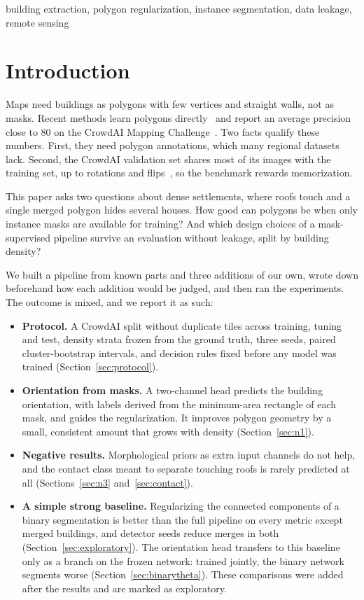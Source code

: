 \documentclass[conference]{IEEEtran}
\begin{document}
\begin{IEEEkeywords}
building extraction, polygon regularization, instance segmentation, data leakage, remote sensing
\end{IEEEkeywords}

\section{Introduction}
Maps need buildings as polygons with few vertices and straight walls, not as masks. Recent methods learn polygons
directly~\cite{girard2021ffl,zorzi2022polyworld,xu2023hisup,jiao2024polyrcnn,adimoolam2025pix2poly} and report an average
precision close to 80 on the CrowdAI Mapping Challenge~\cite{mohanty2020crowdai}. Two facts qualify these numbers. First,
they need polygon annotations, which many regional datasets lack. Second, the CrowdAI validation set shares most of its
images with the training set, up to rotations and flips~\cite{adimoolam2023leakage}, so the benchmark rewards
memorization.

This paper asks two questions about dense settlements, where roofs touch and a single merged polygon hides several
houses. How good can polygons be when only instance masks are available for training? And which design choices of a
mask-supervised pipeline survive an evaluation without leakage, split by building density?

We built a pipeline from known parts and three additions of our own, wrote down beforehand how each addition would be
judged, and then ran the experiments. The outcome is mixed, and we report it as such:
\begin{itemize}
\item \textbf{Protocol.} A CrowdAI split without duplicate tiles across training, tuning and test, density strata frozen
from the ground truth, three seeds, paired cluster-bootstrap intervals, and decision rules fixed before any model was
trained (Section~\ref{sec:protocol}).
\item \textbf{Orientation from masks.} A two-channel head predicts the building orientation, with labels derived from the
minimum-area rectangle of each mask, and guides the regularization. It improves polygon geometry by a small, consistent
amount that grows with density (Section~\ref{sec:n1}).
\item \textbf{Negative results.} Morphological priors as extra input channels do not help, and the contact class meant to
separate touching roofs is rarely predicted at all (Sections~\ref{sec:n3} and~\ref{sec:contact}).
\item \textbf{A simple strong baseline.} Regularizing the connected components of a binary segmentation is better than
the full pipeline on every metric except merged buildings, and detector seeds reduce merges in both
(Section~\ref{sec:exploratory}). The orientation head transfers to this baseline only as a branch on the frozen
network: trained jointly, the binary network segments worse (Section~\ref{sec:binarytheta}). These comparisons were
added after the results and are marked as exploratory.
\end{itemize}
\end{document}
